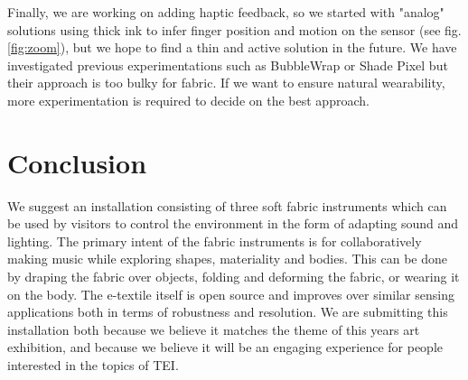 \documentclass{sigchi-ext}
\begin{document}
Finally, we are working on adding haptic feedback, so we started with "analog" solutions using thick ink to infer finger position and motion on the sensor (see fig. \ref{fig:zoom}), but we hope to find a thin and active solution in the future.
We have investigated previous experimentations such as BubbleWrap \cite{bubblewrap} or Shade Pixel \cite{shadepixel} but their approach is too bulky for fabric. If we want to ensure natural wearability, more experimentation is required to decide on the best approach.


\section{Conclusion}
We suggest an installation consisting of three soft fabric instruments which can be used by visitors to control the environment in the form of adapting sound and lighting. The primary intent of the fabric instruments is for collaboratively making music while exploring shapes, materiality and bodies. This can be done by draping the fabric over objects, folding and deforming the fabric, or wearing it on the body. The e-textile itself is open source and improves over similar sensing applications both in terms of robustness and resolution. We are submitting this installation both because we believe it matches the theme of this years art exhibition, and because we believe it will be an engaging experience for people interested in the topics of TEI.


\balance{}



\end{document}
